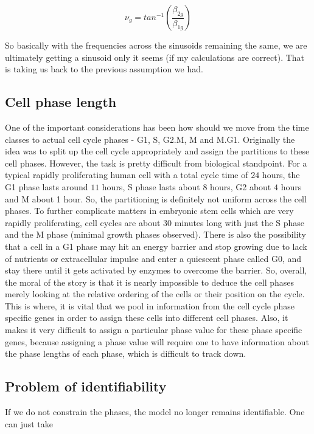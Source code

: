 \documentclass[11pt]{article}
\begin{document}
$$ \nu_g = tan^{-1}  \left (\frac{\beta_{2g}}{\beta_{1g}} \right ) $$   

So basically with the frequencies across the sinusoids remaining the same, we are ultimately getting a sinusoid only it seems (if my calculations are correct). That is taking us back to the previous assumption we had. 

\subsection{Cell phase length}

One of the important considerations has been how should we move from the  time classes to actual  cell cycle phases - G1, S, G2.M, M and M.G1. Originally the idea was to split up the cell cycle appropriately and assign the partitions to these cell phases. However, the task is pretty difficult from biological standpoint. For a typical rapidly proliferating human cell with a total cycle time of $24$ hours, the G1 phase lasts around $11$ hours, S phase lasts about $8$ hours, G2 about $4$ hours and M about 1 hour. So, the partitioning is definitely not uniform across the cell phases. To further complicate matters in embryonic stem cells which are very rapidly proliferating, cell cycles are about 30 minutes long with just the S phase and the M phase (minimal growth phases observed). There is also the possibility that a cell in a G1 phase may hit an energy barrier and stop growing due to lack of nutrients or extracellular impulse and enter a quiescent phase called G0, and stay there until it gets activated by enzymes to overcome the barrier. So, overall, the moral of the story is that it is nearly impossible to deduce the cell phases merely looking at the relative ordering of the cells or their position on the cycle. This is where, it is vital that we pool in information from the cell cycle phase specific genes in order to assign these cells into different cell phases. Also, it makes it very difficult to assign a particular phase value for these phase specific genes, because assigning a phase value will require one to have information about the phase lengths of each phase, which is difficult to track down. 

\subsection{Problem of identifiability}

If we do not constrain the phases, the model no longer remains identifiable. One can just take 
\end{document}
